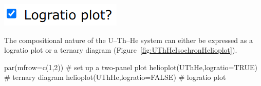 \begin{refsection}
\noindent\begin{minipage}[t]{.18\linewidth}
\strut\vspace*{-\baselineskip}\newline
\includegraphics[width=\linewidth]{../figures/UThHelioplotLogratio.png}
\end{minipage}
\begin{minipage}[t]{.82\textwidth}
  The compositional nature of the U--Th--He system can either be
  expressed as a logratio plot or a ternary diagram
  (Figure~\ref{fig:UThHeIsochronHelioplot}).\\
\end{minipage}

\begin{script}
par(mfrow=c(1,2)) # set up a two-panel plot
helioplot(UThHe,logratio=TRUE)  # ternary diagram
helioplot(UThHe,logratio=FALSE) # logratio plot
\end{script}

\printbibliography[heading=subbibliography]

\end{refsection}
